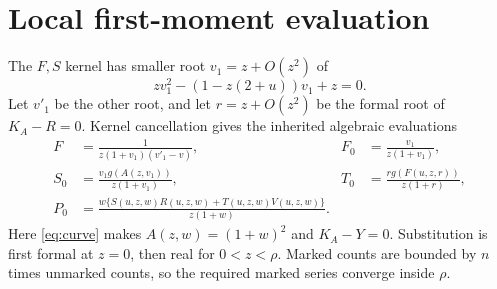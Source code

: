 \documentclass[11pt]{amsart}
\numberwithin{equation}{section}
\theoremstyle{remark}\newtheorem{remark}[theorem]{Remark}
\begin{document}
\section{Local first-moment evaluation}
The $F,S$ kernel has smaller root $v_1=z+O(z^2)$ of
\[
 zv_1^2-(1-z(2+u))v_1+z=0.
\]
Let $v'_1$ be the other root, and let $r=z+O(z^2)$ be the formal root of $K_A-R=0$. Kernel cancellation gives the inherited algebraic evaluations \cite[Corollary 5.5]{N2}
\begin{align}\label{eq:K}
 F&=\frac1{z(1+v_1)(v'_1-v)},& F_0&=\frac{v_1}{z(1+v_1)},\nonumber\\
 S_0&=\frac{v_1g(A(z,v_1))}{z(1+v_1)},&
 T_0&=\frac{r g(F(u,z,r))}{z(1+r)},\nonumber\\
 P_0&=\frac{w\{S(u,z,w)R(u,z,w)+T(u,z,w)V(u,z,w)\}}{z(1+w)}.
\end{align}
Here \eqref{eq:curve} makes $A(z,w)=(1+w)^2$ and $K_A-Y=0$. Substitution is first formal at $z=0$, then real for $0<z<\rho$. Marked counts are bounded by $n$ times unmarked counts, so the required marked series converge inside $\rho$.
\end{document}
